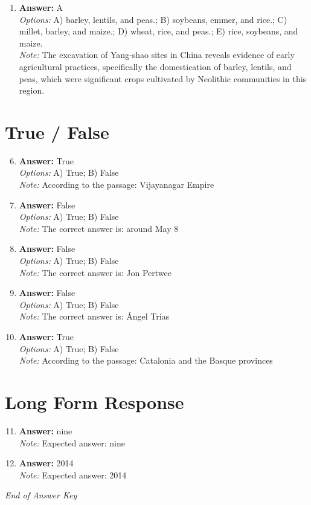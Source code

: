 \documentclass[12pt]{article}
\begin{document}
\begin{enumerate}[label=\arabic*.]
\item \textbf{Answer:} A
\\ \textit{Options:} A) barley, lentils, and peas.; B) soybeans, emmer, and rice.; C) millet, barley, and maize.; D) wheat, rice, and peas.; E) rice, soybeans, and maize.
\\ \textit{Note:} The excavation of Yang-shao sites in China reveals evidence of early agricultural practices, specifically the domestication of barley, lentils, and peas, which were significant crops cultivated by Neolithic communities in this region.
\end{enumerate}

\section*{True / False}
\begin{enumerate}[label=\arabic*.]
\setcounter{enumi}{5}
\item \textbf{Answer:} True
\\ \textit{Options:} A) True; B) False
\\ \textit{Note:} According to the passage: Vijayanagar Empire
\item \textbf{Answer:} False
\\ \textit{Options:} A) True; B) False
\\ \textit{Note:} The correct answer is: around May 8
\item \textbf{Answer:} False
\\ \textit{Options:} A) True; B) False
\\ \textit{Note:} The correct answer is: Jon Pertwee
\item \textbf{Answer:} False
\\ \textit{Options:} A) True; B) False
\\ \textit{Note:} The correct answer is: Ángel Trías
\item \textbf{Answer:} True
\\ \textit{Options:} A) True; B) False
\\ \textit{Note:} According to the passage: Catalonia and the Basque provinces
\end{enumerate}

\section*{Long Form Response}
\begin{enumerate}[label=\arabic*.]
\setcounter{enumi}{10}
\item \textbf{Answer:} nine
\\ \textit{Note:} Expected answer: nine
\item \textbf{Answer:} 2014
\\ \textit{Note:} Expected answer: 2014
\end{enumerate}

\vfill
\noindent\textit{End of Answer Key}
\end{document}

